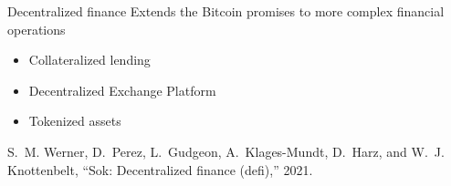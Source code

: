 \documentclass{beamer}
\begin{document}
\begin{frame}{Decentralized finance}
Extends the Bitcoin promises to more complex financial operations
\begin{itemize}
  \item Collateralized lending
  \item Decentralized Exchange Platform
  \item Tokenized assets
\end{itemize}
\vspace{0.3cm}
\scriptsize
\begin{thebibliography}{1}

S.~M. Werner, D.~Perez, L.~Gudgeon, A.~Klages-Mundt, D.~Harz, and W.~J.
  Knottenbelt, ``Sok: Decentralized finance (defi),'' 2021.

\end{thebibliography}

\end{frame}
\end{document}
